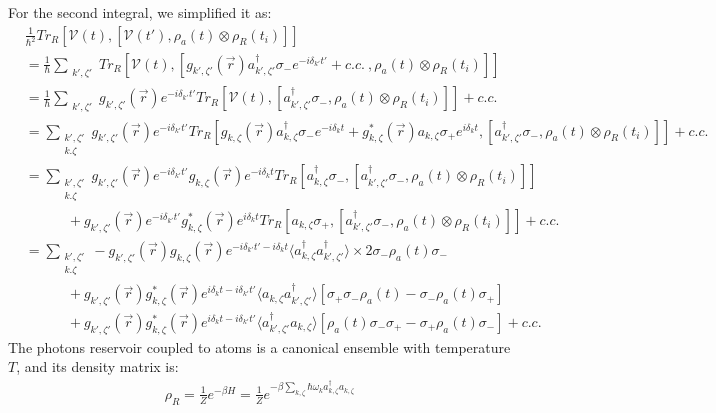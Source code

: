 \documentclass[11pt]{article}
\begin{document}
For the second integral, we simplified it as:
\begin{align}
 &\frac{1}{\hbar^2}Tr_{R} [\mathcal{V}(t), [\mathcal{V}(t'),\rho_a(t)\otimes\rho_R(t_i)]] \\
&= \frac{1}{\hbar} \sum_{\substack{k',\zeta'}}Tr_{R} [ \mathcal{V}(t), [g_{k',\zeta'}(\vec{r})a_{k',\zeta'}^\dagger \sigma_{-} e^{-i\delta_{k'} t'} +c.c.\ , \rho_a(t)\otimes\rho_R(t_i)]]\\
&= \frac{1}{\hbar}\sum_{\substack{k',\zeta'}}g_{k',\zeta'} (\vec{r})e^{-i\delta_{k'} t'}Tr_{R} [ \mathcal{V}(t), [a_{k',\zeta'}^\dagger \sigma_{-} , \rho_a(t)\otimes\rho_R(t_i)] ] + c.c.\\
&=\sum_{\substack{k',\zeta'\\k.\zeta}}g_{k',\zeta'} (\vec{r})e^{-i\delta_{k'} t'}Tr_{R} [g_{k,\zeta}(\vec{r})a_{k,\zeta}^\dagger \sigma_{-} e^{-i\delta_{k} t} + g^*_{k,\zeta}(\vec{r})a_{k,\zeta} \sigma_{+}e^{i\delta_{k} t} , [a_{k',\zeta'}^\dagger \sigma_{-} , \rho_a(t)\otimes\rho_R(t_i)] ] + c.c.\\
&=\sum_{\substack{k',\zeta'\\k.\zeta}}g_{k',\zeta'} (\vec{r})e^{-i\delta_{k'} t'}g_{k,\zeta}(\vec{r})e^{-i\delta_{k} t}Tr_{R} [a_{k,\zeta}^\dagger \sigma_{-}  , [a_{k',\zeta'}^\dagger \sigma_{-} , \rho_a(t)\otimes\rho_R(t_i)] ] \\
&\quad\quad\quad+ g_{k',\zeta'} (\vec{r})e^{-i\delta_{k'} t'}g^*_{k,\zeta}(\vec{r})e^{i\delta_{k} t}Tr_{R} [a_{k,\zeta} \sigma_{+} , [a_{k',\zeta'}^\dagger \sigma_{-} , \rho_a(t)\otimes\rho_R(t_i)] ] + c.c.\\
&=\sum_{\substack{k',\zeta'\\k.\zeta}} -g_{k',\zeta'} (\vec{r})g_{k,\zeta}(\vec{r})e^{-i\delta_{k'} t'-i\delta_{k} t} \langle a_{k,\zeta}^\dagger a_{k',\zeta'}^\dagger \rangle  \times 2\sigma_{-}\rho_a(t) \sigma_{-} \\
&\quad\quad\quad+ g_{k',\zeta'} (\vec{r})g^*_{k,\zeta}(\vec{r})e^{i\delta_{k} t-i\delta_{k'} t'} \langle a_{k,\zeta} a_{k',\zeta'}^\dagger \rangle [\sigma_{+}\sigma_{-}\rho_a(t) - \sigma_{-}\rho_a(t)\sigma_{+}  ]\\
 &\quad\quad\quad+ g_{k',\zeta'} (\vec{r})g^*_{k,\zeta}(\vec{r})e^{i\delta_{k} t-i\delta_{k'} t'} \langle a_{k',\zeta'}^\dagger a_{k,\zeta}  \rangle  [\rho_a(t)\sigma_{-}\sigma_{+} - \sigma_{+}\rho_a(t)\sigma_{-}]+ c.c.
\end{align}
The photons reservoir coupled to atoms is a canonical ensemble with temperature $T$, and its density matrix is:
\begin{align}
\rho_R = \frac{1}{Z} e^{-\beta H} = \frac{1}{Z} e^{-\beta \sum_{k,\zeta}\hbar \omega_k a_{k,\zeta}^\dagger a_{k,\zeta}} 
\end{align}
\end{document}
